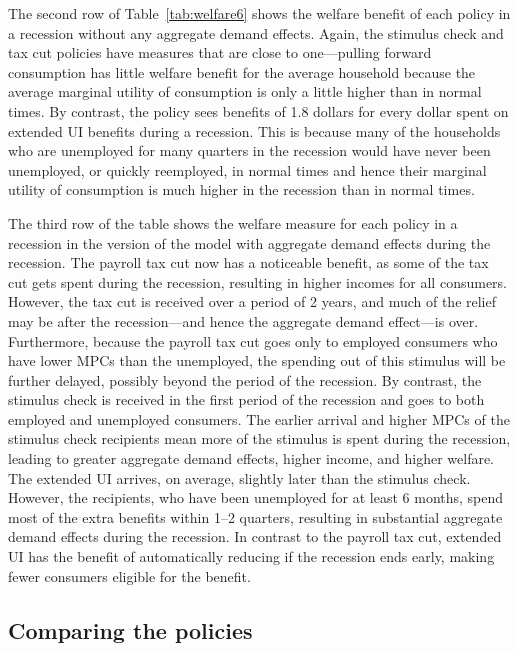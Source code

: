 \documentclass{econsocart}
\begin{document}
The second row of Table~\ref{tab:welfare6} shows the welfare benefit of each policy in a recession without any aggregate demand effects.
Again, the stimulus check and tax cut policies have measures that are close to one---pulling forward consumption has little welfare benefit for the average household because the average marginal utility of consumption is only a little higher than in normal times.
By contrast, the policy sees benefits of 1.8 dollars for every dollar spent on extended UI benefits during a recession.
This is because many of the households who are unemployed for many quarters in the recession would have never been unemployed, or quickly reemployed, in normal times and hence their marginal utility of consumption is much higher in the recession than in normal times.

The third row of the table shows the welfare measure for each policy in a recession in the version of the model with aggregate demand effects during the recession.
The payroll tax cut now has a noticeable benefit, as some of the tax cut gets spent during the recession, resulting in higher incomes for all consumers.
However, the tax cut is received over a period of 2 years, and much of the relief may be after the recession---and hence the aggregate demand effect---is over.
Furthermore, because the payroll tax cut goes only to employed consumers who have lower MPCs than the unemployed, the spending out of this stimulus will be further delayed, possibly beyond the period of the recession.
By contrast, the stimulus check is received in the first period of the recession and goes to both employed and unemployed consumers.
The earlier arrival and higher MPCs of the stimulus check recipients mean more of the stimulus is spent during the recession, leading to greater aggregate demand effects, higher income, and higher welfare.
The extended UI arrives, on average, slightly later than the stimulus check.
However, the recipients, who have been unemployed for at least 6 months, spend most of the extra benefits within 1--2 quarters, resulting in substantial aggregate demand effects during the recession.
In contrast to the payroll tax cut, extended UI has the benefit of automatically reducing if the recession ends early, making fewer consumers eligible for the benefit.

\subsection{Comparing the policies}
\whenintegrated{\label{subsec:comparing-the-policies}} %
\end{document}
